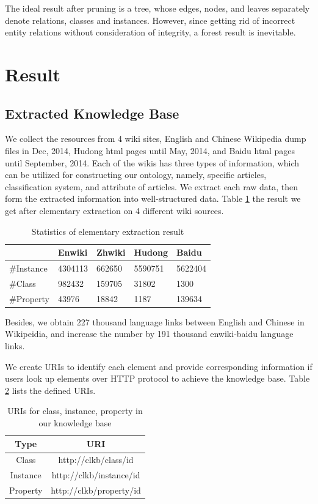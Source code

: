 \documentclass[runningheads,a4paper]{llncs}
\begin{document}
The ideal result after pruning is a tree, whose edges, nodes, and leaves separately denote relations, classes and instances. However, since getting rid of incorrect entity relations without consideration of integrity, a forest result is inevitable.

\section{Result}
\label{sec:result}

\subsection{Extracted Knowledge Base}
We collect the resources from 4 wiki sites, English and Chinese Wikipedia dump files in Dec, 2014, Hudong html pages until May, 2014, and Baidu html pages until September, 2014. Each of the wikis has three types of information, which can be utilized for constructing our ontology, namely, specific articles, classification system, and attribute of articles. We extract each raw data, then form the extracted information into well-structured data. Table \ref{tab:extract-result} the result we get after elementary extraction on 4 different wiki sources.

\begin{table}[h]
\small
\centering
\caption{Statistics of elementary extraction result}
\label{tab:extract-result}
    \begin{tabular}{|l|l|l|l|l|}
        \hline
                 & Enwiki  & Zhwiki & Hudong  & Baidu   \\ \hline
        \#Instance & 4304113 & 662650 & 5590751 & 5622404 \\ \hline
        \#Class    & 982432  & 159705 & 31802   & 1300    \\ \hline
        \#Property & 43976   & 18842  & 1187    & 139634  \\ \hline
    \end{tabular}
\end{table}

Besides, we obtain 227 thousand language links between English and Chinese in Wikipeidia, and increase the number by 191 thousand enwiki-baidu language links.

We create URIs to identify each element and provide corresponding information if users look up elements over HTTP protocol to achieve the knowledge base. Table \ref{tab:uris} lists the defined URIs.
\begin{table}[h]
\small
\centering
\caption{URIs for class, instance, property in our knowledge base}
\label{tab:uris}
    \begin{tabular}{|c|c|}
        \hline
        Type     & URI                     \\ \hline
        Class    & http://clkb/class/id  \\ \hline
        Instance & http://clkb/instance/id \\ \hline
        Property & http://clkb/property/id \\ \hline
    \end{tabular}
\end{table}
\end{document}
